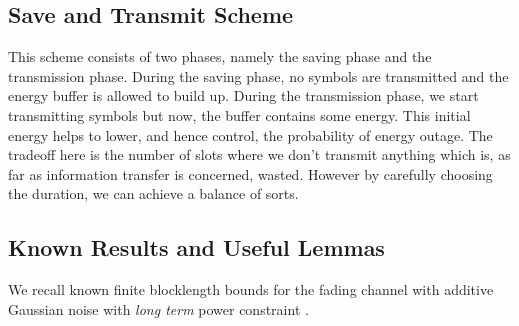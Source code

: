 \documentclass[conference]{IEEEtran}
\begin{document}
\subsection{Save and Transmit Scheme}
This scheme consists of two phases, namely the saving phase and the transmission phase. During the saving phase, no symbols are transmitted and the energy buffer is allowed to build up. During the transmission phase, we start transmitting symbols but now, the buffer contains some energy. This initial energy helps to lower, and hence control, the probability of energy outage. The tradeoff here is the number of slots where we don't transmit anything which is, as far as information transfer is concerned, wasted. However by carefully choosing the duration, we can achieve a balance of sorts.

\subsection{Known Results and Useful Lemmas}
We recall known finite blocklength bounds for the fading channel with additive Gaussian noise with \emph{long term} power constraint \cite{deeks2018, polyf}. 
\end{document}
